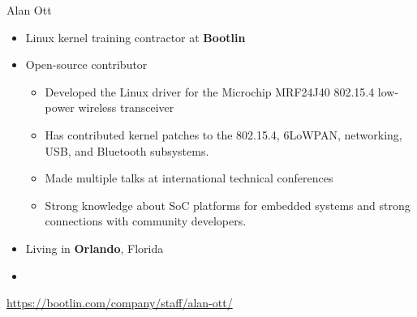 \begin{frame}{Alan Ott}
    \begin{itemize}
      \item Linux kernel training contractor at {\bf Bootlin}
      \item Open-source contributor
        \begin{itemize}
	  \item Developed the Linux driver for the Microchip MRF24J40 802.15.4
		low-power wireless transceiver
	  \item Has contributed kernel patches to the 802.15.4, 6LoWPAN,
		networking, USB, and Bluetooth subsystems.
	  \item Made multiple talks at international technical conferences
	  \item Strong knowledge about SoC platforms for embedded
		systems and strong connections with community developers.
        \end{itemize}
      \item Living in {\bf Orlando}, Florida
      \item {}
    \end{itemize}
    {\small \url{https://bootlin.com/company/staff/alan-ott/}}
\end{frame}

